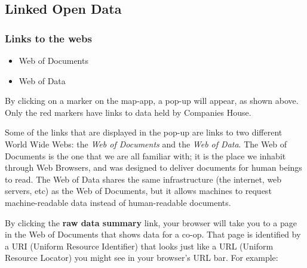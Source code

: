 \subsection{Linked Open Data}
\frame
{
  \frametitle{Links to the webs}
  \begin{center}
  \end{center}
  \begin{itemize}
    \item Web of Documents
    \item Web of Data
  \end{itemize}
}
By clicking on a marker on the map-app, a pop-up will appear, as shown above.
Only the red markers have links to data held by Companies House.


Some of the links that are displayed in the pop-up are links to two different World Wide Webs: the \textit{Web of Documents} and the \textit{Web of Data}.
The Web of Documents is the one that we are all familiar with; it is the place we inhabit through Web Browsers, and was designed to deliver documents for human beings to read.
The Web of Data shares the same infrastructure (the internet, web servers, etc) as the Web of Documents, but it allows machines to request machine-readable data instead of human-readable documents.

By clicking the \textbf{raw data summary} link, your browser will take you to a page in the Web of Documents that shows data for a co-op. 
That page is identified by a URI (Uniform Resource Identifier) that looks just like a URL (Uniform Resource Locator) you might see in your browser's URL bar. For example:

